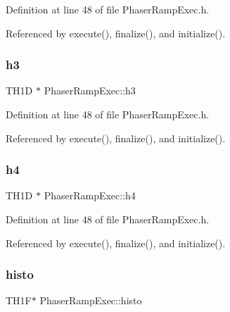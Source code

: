 Definition at line 48 of file Phaser\+Ramp\+Exec.\+h.



Referenced by execute(), finalize(), and initialize().

\mbox{\label{classPhaserRampExec_ad9ec4185f676732648c4886f28c9c6b7}} 
\subsubsection{\texorpdfstring{h3}{h3}}
{\footnotesize\ttfamily T\+H1D $\ast$ Phaser\+Ramp\+Exec\+::h3\hspace{0.3cm}{\ttfamily [private]}}



Definition at line 48 of file Phaser\+Ramp\+Exec.\+h.



Referenced by execute(), finalize(), and initialize().

\mbox{\label{classPhaserRampExec_aa487df389ad66093dba562f27f558128}} 
\subsubsection{\texorpdfstring{h4}{h4}}
{\footnotesize\ttfamily T\+H1D $\ast$ Phaser\+Ramp\+Exec\+::h4\hspace{0.3cm}{\ttfamily [private]}}



Definition at line 48 of file Phaser\+Ramp\+Exec.\+h.



Referenced by execute(), finalize(), and initialize().

\mbox{\label{classPhaserRampExec_a0c8d1c3ee09159cba1b1a07ce3fb1d96}} 
\subsubsection{\texorpdfstring{histo}{histo}}
{\footnotesize\ttfamily T\+H1F$\ast$ Phaser\+Ramp\+Exec\+::histo\hspace{0.3cm}{\ttfamily [private]}}



